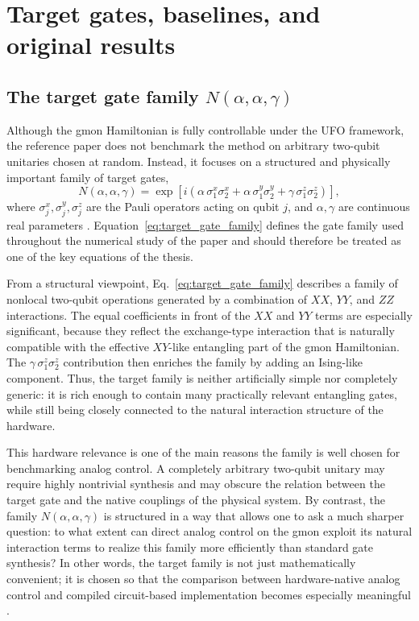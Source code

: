 \section{Target gates, baselines, and original results}
\subsection{The target gate family \(N(\alpha,\alpha,\gamma)\)}
\label{subsec:target_gate_family}

Although the gmon Hamiltonian is fully controllable under the UFO framework, the reference paper does not benchmark the method on arbitrary two-qubit unitaries chosen at random. Instead, it focuses on a structured and physically important family of target gates,
\begin{equation}
N(\alpha,\alpha,\gamma)
=
\exp\!\left[
i\left(
\alpha\,\sigma_1^x\sigma_2^x
+
\alpha\,\sigma_1^y\sigma_2^y
+
\gamma\,\sigma_1^z\sigma_2^z
\right)
\right],
\label{eq:target_gate_family}
\end{equation}
where \(\sigma_j^x,\sigma_j^y,\sigma_j^z\) are the Pauli operators acting on qubit \(j\), and \(\alpha,\gamma\) are continuous real parameters \cite{Niu2019}. Equation~\eqref{eq:target_gate_family} defines the gate family used throughout the numerical study of the paper and should therefore be treated as one of the key equations of the thesis.

From a structural viewpoint, Eq.~\eqref{eq:target_gate_family} describes a family of nonlocal two-qubit operations generated by a combination of \(XX\), \(YY\), and \(ZZ\) interactions. The equal coefficients in front of the \(XX\) and \(YY\) terms are especially significant, because they reflect the exchange-type interaction that is naturally compatible with the effective \(XY\)-like entangling part of the gmon Hamiltonian. The \(\gamma\,\sigma_1^z\sigma_2^z\) contribution then enriches the family by adding an Ising-like component. Thus, the target family is neither artificially simple nor completely generic: it is rich enough to contain many practically relevant entangling gates, while still being closely connected to the natural interaction structure of the hardware.

This hardware relevance is one of the main reasons the family is well chosen for benchmarking analog control. A completely arbitrary two-qubit unitary may require highly nontrivial synthesis and may obscure the relation between the target gate and the native couplings of the physical system. By contrast, the family \(N(\alpha,\alpha,\gamma)\) is structured in a way that allows one to ask a much sharper question: to what extent can direct analog control on the gmon exploit its natural interaction terms to realize this family more efficiently than standard gate synthesis? In other words, the target family is not just mathematically convenient; it is chosen so that the comparison between hardware-native analog control and compiled circuit-based implementation becomes especially meaningful \cite{Niu2019}.

